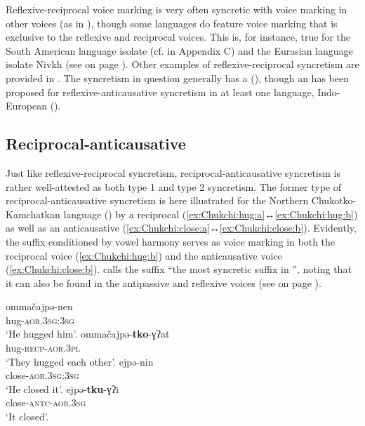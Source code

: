 Reflexive-reciprocal voice marking is very often syncretic with voice marking in other voices (as in ), though some languages do feature voice marking that is exclusive to the reflexive and reciprocal voices. This is, for instance, true for the South American language isolate  (cf.  in Appendix C) and the Eurasian language isolate Nivkh (see  on page \pageref{tab:ch7:refl-antc-world}). Other examples of reflexive-reciprocal syncretism are provided in . The syncretism in question generally has a  (), though an  has been proposed for reflexive-anticausative syncretism in at least one language, Indo-European  ().

\subsection{Reciprocal-anticausative} \label{sec:simple-syncretism:recp-antc}
Just like reflexive-reciprocal syncretism, reciprocal-anticausative syncretism is rather well-attested as both type 1 and type 2 syncretism. The former type of reciprocal-anticausative syncretism is here illustrated for the Northern Chu\-kot\-ko-Kam\-chat\-kan language  () by a reciprocal  (\ref{ex:Chukchi:hug:a}↔\ref{ex:Chukchi:hug:b}) as well as an anticausative  (\ref{ex:Chukchi:close:a}↔\ref{ex:Chukchi:close:b}). Evidently, the suffix  conditioned by vowel harmony \citep[48]{dunn:1999} serves as voice marking in both the reciprocal voice (\ref{ex:Chukchi:hug:b}) and the anticausative voice (\ref{ex:Chukchi:close:b}). \citet[221f.]{nedjalkov:2006} calls the suffix “the most syncretic suffix in ”, noting that it can also be found in the antipassive and reflexive voices (see  on page \pageref{tab:ch5:antp-refl-recp-antc}).

\ea {} \citep[222]{nedjalkov:2006}
\ea\label{ex:Chukchi:hug:a}
	\gll	ommačajpə-nen \\
			hug-\textsc{aor.3sg:3sg} \\
	\glt	‘He hugged him’.
\ex\label{ex:Chukchi:hug:b}
	\gll	ommačajpə-\textbf{tko}-ɣʔat \\
			hug-\textsc{recp-aor.3pl} \\
	\glt	‘They hugged each other’.
\ex\label{ex:Chukchi:close:a}
	\gll	ejpə-nin \\
			close-\textsc{aor.3sg:3sg} \\
	\glt	‘He closed it’.
\ex\label{ex:Chukchi:close:b}
	\gll	ejpə-\textbf{tku}-ɣʔi \\
			close-\textsc{antc-aor.3sg} \\
	\glt	‘It closed’.
	\z 
\z

